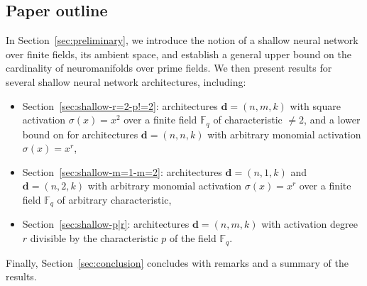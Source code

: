 \documentclass[a4paper]{cas-sc}
\newcommand{\dd}{\mathbf{d}}    %
\newcommand{\F}{\mathbb{F}}
\begin{document}
\subsection{Paper outline}
\label{subsec:paper-outline}
    In Section~\ref{sec:preliminary}, we introduce the notion of a shallow neural network over finite fields, its ambient space, and establish a general upper bound on the cardinality of neuromanifolds over prime fields. We then present results for several shallow neural network architectures, including:
    \begin{itemize}
        \item Section~\ref{sec:shallow-r=2-p!=2}: architectures $\dd = (n,m,k)$ with square activation $\sigma(x) = x^2$ over a finite field $\F_q$ of characteristic $\neq 2$, and a lower bound on for architectures $\dd = (n,n,k)$ with arbitrary monomial activation $\sigma(x) = x^r$,
        \item Section~\ref{sec:shallow-m=1-m=2}: architectures $\dd = (n,1,k)$ and $\dd = (n,2,k)$ with arbitrary monomial activation $\sigma(x) = x^r$ over a finite field $\F_q$ of arbitrary characteristic,
        \item Section~\ref{sec:shallow-p|r}: architectures $\dd = (n,m,k)$ with activation degree $r$ divisible by the characteristic $p$ of the field $\F_q$.
    \end{itemize}
    Finally, Section~\ref{sec:conclusion} concludes with remarks and a summary of the results.
\end{document}
